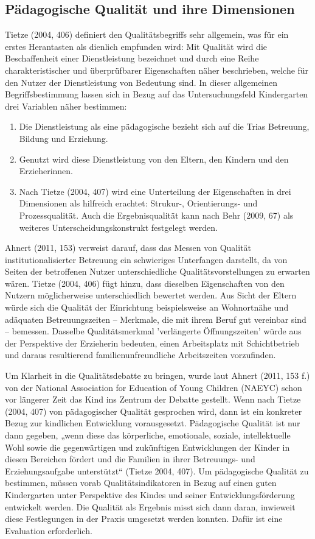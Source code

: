 \subsection{Pädagogische Qualität und ihre Dimensionen}

Tietze (2004, 406) definiert den Qualitätsbegriffs sehr allgemein, was für ein erstes Herantasten als dienlich empfunden wird: Mit Qualität wird die Beschaffenheit einer Dienstleistung bezeichnet und durch eine Reihe charakteristischer und überprüfbarer Eigenschaften näher beschrieben, welche für den Nutzer der Dienstleistung von Bedeutung sind. In dieser allgemeinen Begriffsbestimmung lassen sich in Bezug auf das Untersuchungsfeld Kindergarten drei Variablen näher bestimmen: \begin{enumerate}
\item Die Dienstleistung als eine pädagogische bezieht sich auf die Trias Betreuung, Bildung und Erziehung.
\item Genutzt wird diese Dienstleistung von den Eltern, den Kindern und den Erzieherinnen.
\item Nach Tietze (2004, 407) wird eine Unterteilung der Eigenschaften in drei Dimensionen als hilfreich erachtet: Strukur-, Orientierungs- und Prozessqualität. Auch die Ergebnisqualität kann nach Behr (2009, 67) als weiteres Unterscheidungskonstrukt festgelegt werden.
\end{enumerate}

Ahnert (2011, 153) verweist darauf, dass das Messen von Qualität institutionalisierter Betreuung ein schwieriges Unterfangen darstellt, da von Seiten der betroffenen Nutzer unterschiedliche Qualitätsvorstellungen zu erwarten wären. Tietze (2004, 406) fügt hinzu, dass dieselben Eigenschaften von den Nutzern möglicherweise unterschiedlich bewertet werden. Aus Sicht der Eltern würde sich die Qualität der Einrichtung beispielsweise an Wohnortnähe und adäquaten Betreuungszeiten -- Merkmale, die mit ihrem Beruf gut vereinbar sind -- bemessen. Dasselbe Qualitätsmerkmal 'verlängerte Öffnungszeiten' würde aus der Perspektive der Erzieherin bedeuten, einen Arbeitsplatz mit Schichtbetrieb und daraus resultierend familienunfreundliche Arbeitszeiten vorzufinden.  

Um Klarheit in die Qualitätsdebatte zu bringen, wurde laut Ahnert (2011, 153 f.) von der National Association for Education of Young Children (NAEYC) schon vor längerer Zeit das Kind ins Zentrum der Debatte gestellt. Wenn nach Tietze (2004, 407) von pädagogischer Qualität gesprochen wird, dann ist ein konkreter Bezug zur kindlichen Entwicklung vorausgesetzt. Pädagogische Qualität ist nur dann gegeben, „wenn diese das körperliche, emotionale, soziale, intellektuelle Wohl sowie die gegenwärtigen und zukünftigen Entwicklungen der Kinder in diesen Bereichen fördert und die Familien in ihrer Betreuungs- und Erziehungsaufgabe unterstützt“ (Tietze 2004, 407). Um pädagogische Qualität zu bestimmen, müssen vorab Qualitätsindikatoren in Bezug auf einen guten Kindergarten unter Perspektive des Kindes und seiner Entwicklungsförderung entwickelt werden. Die Qualität als Ergebnis misst sich dann daran, inwieweit diese Festlegungen in der Praxis umgesetzt werden konnten. Dafür ist eine Evaluation erforderlich. 

